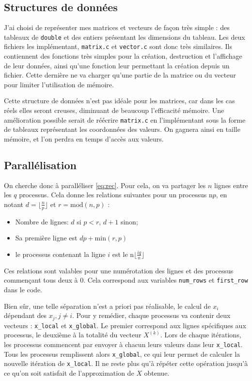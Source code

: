 \documentclass[11pt, a4paper]{article}
\begin{document}
\subsection{Structures de données}
J'ai choisi de représenter mes matrices et vecteurs de façon très simple :
des tableaux de \lstinline{double} et des entiers présentant les dimensions du tableau.
Les deux fichiers les implémentant, \texttt{matrix.c} et \texttt{vector.c} sont donc très similaires.
Ils contiennent des fonctions très simples pour la création, destruction et l'affichage de leur données, ainsi qu'une fonction leur permettant la création depuis un fichier. Cette dernière ne va charger qu'une partie de la matrice ou du vecteur pour limiter l'utilisation de mémoire.

\bigskip
Cette structure de données n'est pas idéale pour les matrices, car dans les cas réels elles seront creuses, diminuant de beaucoup l'efficacité mémoire.
Une amélioration possible serait de réécrire \texttt{matrix.c} en l'implémentant sous la forme de tableaux représentant les coordonnées des valeurs.
On gagnera ainsi en taille mémoire, et l'on perdra en temps d'accès aux valeurs.

\subsection{Parallélisation}

On cherche donc à paralléliser \eqref{eq:rec}.
Pour cela, on va partager les \(n\) lignes entre les \(q\) processus.
Cela donne les relations suivantes pour un processus n\textdegree\(p\), en notant \(d = \lfloor \frac{n}{p} \rfloor\) et \(r = \text{mod}(n,p)\) :
\begin{itemize}
    \item Nombre de lignes:  \(d\) si \(p<r\), \(d+1\) sinon;
    \item Sa première ligne est \(dp+\text{min}(r,p)\)
    \item le processus contenant la ligne \(i\) est le n\textdegree\(\lfloor \frac{iq}{n} \rfloor\)
\end{itemize}
Ces relations sont valables pour une numérotation des lignes et des processus commençant tous deux à 0.
Cela correspond aux variables \lstinline{num_rows} et
\lstinline{first_row} dans le code.

\bigskip

Bien sûr, une telle séparation n'est a priori pas réalisable, le calcul de \(x_i\) dépendant des \(x_j, j \neq i\).
Pour y remédier, chaque processus va contenir deux vecteurs : \lstinline{x_local} et \lstinline{x_global}.
Le premier correspond aux lignes spécifiques aux processus, le deuxième à la totalité du vecteur \(X^{(k)}\).
Lors de chaque itérations, les processus commencent par envoyer à chacun leurs valeurs dans leur \lstinline{x_local}.
Tous les processus remplissent alors \lstinline{x_global}, ce qui leur permet de calculer la nouvelle itération de \lstinline{x_local}.
Il ne reste plus qu'à répéter cette opération jusqu'à ce qu'on soit satisfait de l'approximation de \(X\) obtenue.
\end{document}
